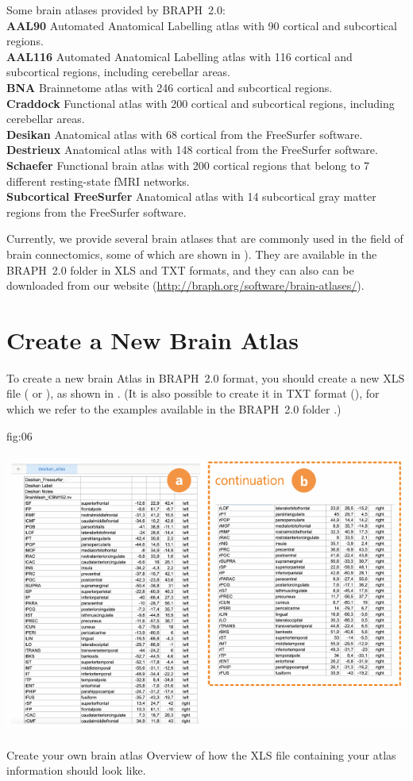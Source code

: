 \documentclass[justified]{tufte-handout}
\begin{document}
	{
	Some brain atlases provided by BRAPH~2.0: \\
	{\bf AAL90} Automated Anatomical Labelling atlas with 90 cortical and subcortical regions.\\
	{\bf AAL116} Automated Anatomical Labelling atlas with 116 cortical and subcortical regions, including cerebellar areas.\\
	{\bf BNA} Brainnetome atlas with 246 cortical and subcortical regions.\\
	{\bf Craddock} Functional atlas with 200 cortical and subcortical regions, including cerebellar areas.\\
	{\bf Desikan} Anatomical atlas with 68 cortical from the FreeSurfer software.\\
	{\bf Destrieux} Anatomical atlas with 148 cortical from the FreeSurfer software.\\
	{\bf Schaefer} Functional brain atlas with 200 cortical regions that belong to 7 different resting-state fMRI networks.\\
	{\bf Subcortical FreeSurfer} Anatomical atlas with 14 subcortical gray matter regions from the FreeSurfer software.
	}

Currently, we provide several brain atlases that are commonly used in the field of brain connectomics, some of which are shown in ). 
They are available in the BRAPH~2.0 folder  in XLS and TXT formats, and they can also can be downloaded from our website (\url{http://braph.org/software/brain-atlases/}).

\clearpage
\section{Create a New Brain Atlas}

To create a new brain Atlas in BRAPH~2.0 format, you should create a new XLS file ( or ), as shown in . 
(It is also possible to create it in TXT format (), for which we refer to the examples available in the BRAPH~2.0 folder .)

	{fig:06}
	{\includegraphics[height=10cm]{fig06.png}}
	{Create your own brain atlas}
	{
	Overview of how the XLS file containing your atlas information should look like.
	}
\end{document}
